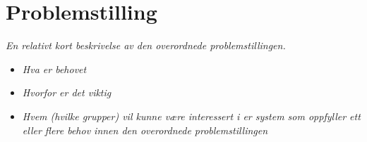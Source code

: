 \section{Problemstilling}
\label{sec:problemstilling}
\textit{En relativt kort beskrivelse av den overordnede problemstillingen.}
\begin{itemize}
\item \textit{Hva er behovet}
\item \textit{Hvorfor er det viktig}
\item \textit{Hvem (hvilke grupper) vil kunne være interessert i er system som oppfyller ett eller flere behov innen den overordnede problemstillingen}
\end{itemize}